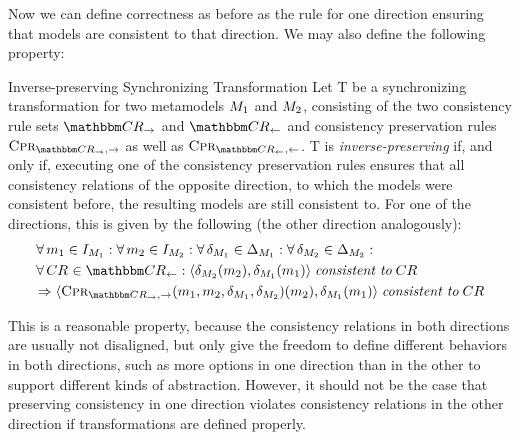 Now we can define correctness as before as the rule for one direction ensuring that models are consistent to that direction.
We may also define the following property:
\begin{definition}{Inverse-preserving Synchronizing Transformation}%
    Let T be a synchronizing transformation for two metamodels $M_{1}$ and $M_{2}$, consisting of the two consistency rule sets $\consistencyrelationset{CR}_{\rightarrow}$ and $\consistencyrelationset{CR}_{\leftarrow}$ and consistency preservation rules $\consistencypreservationrule{\consistencyrelationset{CR}_{\rightarrow},\rightarrow}$ as well as $\consistencypreservationrule{\consistencyrelationset{CR}_{\leftarrow},\leftarrow}$.
    T is \emph{inverse-preserving} if, and only if, executing one of the consistency preservation rules ensures that all consistency relations of the opposite direction, to which the models were consistent before, the resulting models are still consistent to.
    For one of the directions, this is given by the following (the other direction analogously):
    \begin{align*}
        & \forall \model{m}{1} \in \metamodelinstanceset{M}{1} : \forall \model{m}{2} \in \metamodelinstanceset{M}{2}: \forall \change{\metamodel{M}{1}} \in \changeuniverse{\metamodel{M}{1}} : \forall \change{\metamodel{M}{2}} \in \changeuniverse{\metamodel{M}{2}} : \\
        & 
        \forall \consistencyrelation{CR}{} \in \consistencyrelationset{CR}_{\leftarrow}:
        \tupled{\change{\metamodel{M}{2}}(\model{m}{2}),\change{\metamodel{M}{1}}(\model{m}{1})} \consistenttomath \consistencyrelation{CR}{} \\
        & 
        \Rightarrow \tupled{\consistencypreservationrule{\consistencyrelationset{CR}_{\rightarrow},\rightarrow}(\model{m}{1},\model{m}{2},\change{\metamodel{M}{1}},\change{\metamodel{M}{2}})(\model{m}{2}), \change{\metamodel{M}{1}}(\model{m}{1})} \consistenttomath \consistencyrelation{CR}{}
    \end{align*}
\end{definition}

This is a reasonable property, because the consistency relations in both directions are usually not disaligned, but only give the freedom to define different behaviors in both directions, such as more options in one direction than in the other to support different kinds of abstraction.
However, it should not be the case that preserving consistency in one direction violates consistency relations in the other direction if transformations are defined properly.

